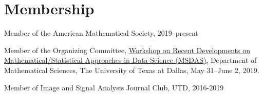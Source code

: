 \documentclass[11pt]{article}
\newenvironment{innerlist}[1][\enskip\textbullet]
        {\begin{compactitem}[#1]}{\end{compactitem}}
\begin{document}
%

\section{Membership}
\vspace{2 mm}
\begin{innerlist}
\item Member of the American Mathematical Society, 2019--present
\item Member of the Organizing Committee, \href{https://sites.google.com/site/utd2019workshop/home}{Workshop on Recent Developments on Mathematical/\allowbreak Statistical Approaches in Data Science (MSDAS)}, Department of Mathematical Sciences, The University of Texas at Dallas, May 31--June 2, 2019.
\item{Member of Image and Signal Analysis Journal Club, UTD, 2016-2019}
\end{innerlist}










\end{document}
